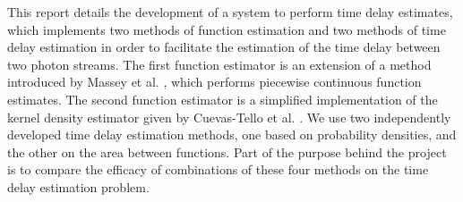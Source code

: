 \documentclass[a4paper,11pt]{article}
\begin{document}
This report details the development of a system to perform time delay estimates,
which implements two methods of function estimation and two methods of time
delay estimation in order to facilitate the estimation of the time delay between
two photon streams. The first function estimator is an extension of a method
introduced by Massey et al. \cite{massey1996estimating}, which performs
piecewise continuous function estimates. The second function estimator is a
simplified implementation of the kernel density estimator given by Cuevas-Tello
et al. \cite{cuevas2006accurate}. We use two independently developed time delay
estimation methods, one based on probability densities, and the other on the
area between functions. Part of the purpose behind the project is to compare the
efficacy of combinations of these four methods on the time delay estimation
problem.

\end{document}
